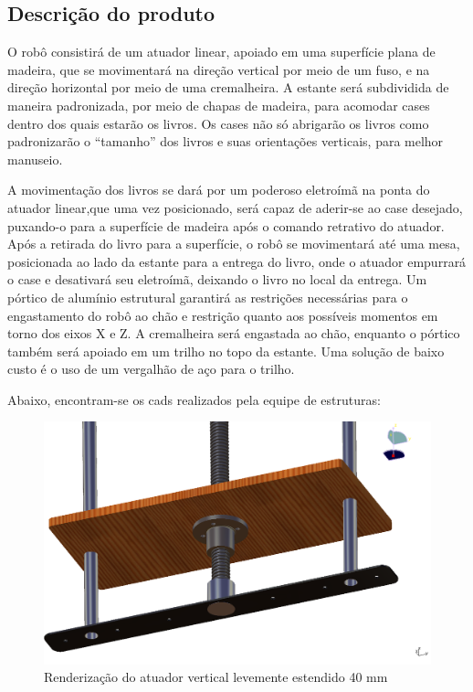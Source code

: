 \subsection{Descrição do produto}

O robô consistirá de um atuador linear, apoiado em uma superfície plana de madeira, que se movimentará na direção vertical por meio de um fuso, e na direção horizontal por meio de uma cremalheira. A estante será subdividida de maneira padronizada, por meio de chapas de madeira, para acomodar cases dentro dos quais estarão os livros. Os cases não só abrigarão os livros como padronizarão o “tamanho” dos livros e suas orientações verticais, para melhor manuseio.

 A movimentação dos livros se dará por um poderoso eletroímã na ponta do atuador linear,que uma vez posicionado, será capaz de aderir-se ao case desejado, puxando-o para a superfície de madeira após o comando retrativo do atuador. Após a retirada do livro para a superfície, o robô se movimentará até uma mesa, posicionada ao lado da estante para a entrega do livro, onde o atuador empurrará o case e desativará seu eletroímã, deixando o livro no local da entrega. Um pórtico de alumínio estrutural garantirá as restrições necessárias para o engastamento do robô ao chão e restrição quanto aos possíveis momentos em torno dos eixos X e Z. A cremalheira será engastada ao chão, enquanto o pórtico também será apoiado em um trilho no topo da estante. Uma solução de baixo custo é o uso de um vergalhão de aço para o trilho.

Abaixo, encontram-se os cads realizados pela equipe de estruturas:
\begin{figure}[!h]		
\centering 
\includegraphics[scale=0.4]{figuras/screen_2}
\caption{Renderização do atuador vertical levemente estendido 40 mm}
\end{figure}
\FloatBarrier

